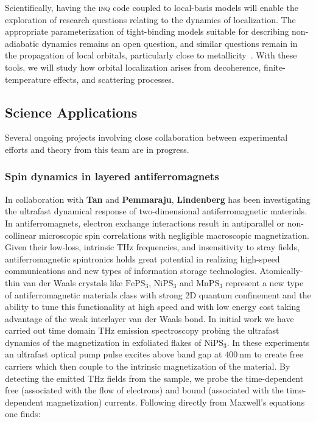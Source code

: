 Scientifically, having the \textsc{inq} code coupled to local-basis models will enable the exploration of research questions relating to the dynamics of localization. 
The appropriate parameterization of tight-binding models suitable for describing non-adiabatic dynamics remains an open question, and similar questions remain in the propagation of local orbitals, particularly close to metallicity~\cite{Yost2019}. 
With these tools, we will study how orbital localization arises from decoherence, finite-temperature effects, and scattering processes.  

\subsection{Science Applications}

Several ongoing projects involving close collaboration between experimental efforts and theory from this team are in progress.

\subsubsection{Spin dynamics in layered antiferromagnets}\label{sec:2dafm}

In collaboration with {\bf Tan} and {\bf Pemmaraju}, {\bf Lindenberg} has been investigating the ultrafast dynamical response of two-dimensional antiferromagnetic materials.
In antiferromagnets, electron exchange interactions result in antiparallel or non-collinear microscopic spin correlations with negligible macroscopic magnetization.
Given their low-loss, intrinsic THz frequencies, and insensitivity to stray fields, antiferromagnetic spintronics holds great potential in realizing high-speed communications and new types of information storage technologies. 
Atomically-thin van der Waals crystals like \(\mathrm{FePS_3}\), \(\mathrm{NiPS_3}\) and \(\mathrm{MnPS_3}\) represent a new type of antiferromagnetic materials class with strong 2D quantum confinement and the ability to tune this functionality at high speed and with low energy cost taking advantage of the weak interlayer van der Waals bond.
In initial work we have carried out time domain THz emission spectroscopy probing the ultrafast dynamics of the magnetization in exfoliated flakes of \(\mathrm{NiPS_3}\).
In these experiments an ultrafast optical pump pulse excites above band gap at \(400~\mathrm{nm}\) to create free carriers which then couple to the intrinsic magnetization of the material.
By detecting the emitted THz fields from the sample, we probe the time-dependent free (associated with the flow of electrons) and bound (associated with the time-dependent magnetization) currents.
Following directly from Maxwell’s equations one finds: 

